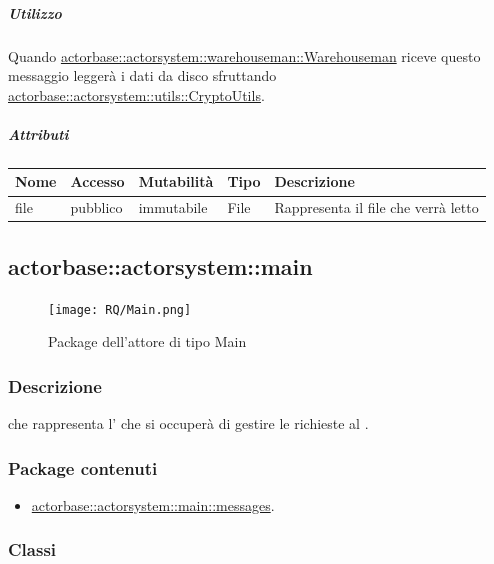 \documentclass{scalatekids-article}
\begin{document}
\subparagraph{Utilizzo}

Quando \hyperref[sec:actorbase::actorsystem::warehouseman::Warehouseman]{actorbase::actorsystem::warehouseman::Warehouseman}
riceve questo messaggio leggerà i dati da disco sfruttando
\hyperref[sec:actorbase::actorsystem::utils::CryptoUtils]{actorbase::actorsystem::utils::CryptoUtils}.

\subparagraph{Attributi}
\begin{tabular}{| p{3cm} | p{1.5cm} | p{2cm} | p{2cm} | p{8.5cm} |}
  \hline
  Nome & Accesso & Mutabilità & Tipo & Descrizione\\
  \hline
  file & pubblico & immutabile & File & Rappresenta il file che verrà letto \\
  \hline
\end{tabular}


\subsection{actorbase::actorsystem::main}
\label{sec:actorbase::actorsystem::main}

\begin{figure}[H]
  \begin{center}
    \texttt{[image: RQ/Main.png]}
    \caption{Package dell'attore di tipo Main}
  \end{center}
\end{figure}

\subsubsection{Descrizione}
 che rappresenta l' che si occuperà di gestire le
richieste al .

\subsubsection{Package contenuti}
\begin{itemize}
\item \hyperref[sec:actorbase::actorsystem::main::messages]{actorbase::actorsystem::main::messages}.
\end{itemize}

\subsubsection{Classi}
\end{document}
